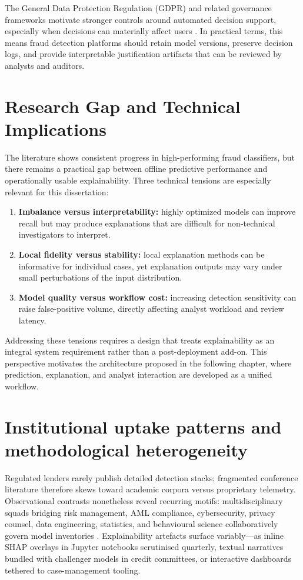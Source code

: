 The General Data Protection Regulation (GDPR) and related governance frameworks motivate stronger controls around automated decision support, especially when decisions can materially affect users \cite{gdpr_text}. In practical terms, this means fraud detection platforms should retain model versions, preserve decision logs, and provide interpretable justification artifacts that can be reviewed by analysts and auditors.

\section{Research Gap and Technical Implications}
The literature shows consistent progress in high-performing fraud classifiers, but there remains a practical gap between offline predictive performance and operationally usable explainability. Three technical tensions are especially relevant for this dissertation:
\begin{enumerate}
    \item \textbf{Imbalance versus interpretability:} highly optimized models can improve recall but may produce explanations that are difficult for non-technical investigators to interpret.
    \item \textbf{Local fidelity versus stability:} local explanation methods can be informative for individual cases, yet explanation outputs may vary under small perturbations of the input distribution.
    \item \textbf{Model quality versus workflow cost:} increasing detection sensitivity can raise false-positive volume, directly affecting analyst workload and review latency.
\end{enumerate}

Addressing these tensions requires a design that treats explainability as an integral system requirement rather than a post-deployment add-on. This perspective motivates the architecture proposed in the following chapter, where prediction, explanation, and analyst interaction are developed as a unified workflow.

\section{Institutional uptake patterns and methodological heterogeneity}
Regulated lenders rarely publish detailed detection stacks; fragmented conference literature therefore skews toward academic corpora versus proprietary telemetry. Observational contrasts nonetheless reveal recurring motifs: multidisciplinary squads bridging risk management, AML compliance, cybersecurity, privacy counsel, data engineering, statistics, and behavioural science collaboratively govern model inventories \cite{fraud_handbook}. Explainability artefacts surface variably—as inline SHAP overlays in Jupyter notebooks scrutinised quarterly, textual narratives bundled with challenger models in credit committees, or interactive dashboards tethered to case-management tooling.

